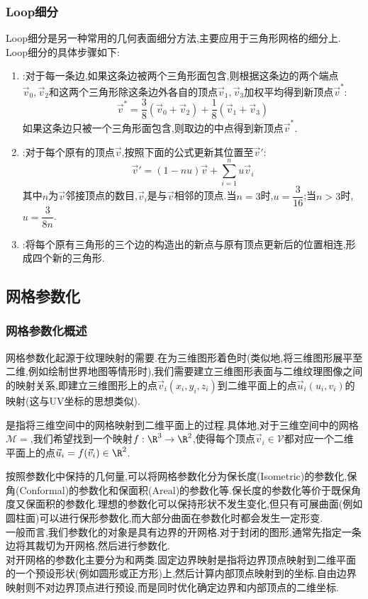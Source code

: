 \documentclass{ctexart}
\begin{document}
\subsubsection{Loop细分}
Loop细分是另一种常用的几何表面细分方法,主要应用于三角形网格的细分上. Loop细分的具体步骤如下:
\begin{enumerate}[label=\tbf{\arabic*}.,topsep=0pt,parsep=0pt,itemsep=0pt,partopsep=0pt]
    \item {}:对于每一条边,如果这条边被两个三角形面包含,则根据这条边的两个端点$\vec{v}_0,\vec{v}_2$和这两个三角形除这条边外各自的顶点$\vec{v}_1,\vec{v}_3$加权平均得到新顶点$\vec{v}^\ast$:
        \[\vec{v}^\ast=\dfrac{3}{8}\left(\vec{v}_0+\vec{v}_2\right)+\dfrac{1}{8}\left(\vec{v}_1+\vec{v}_3\right)\]
    如果这条边只被一个三角形面包含,则取边的中点得到新顶点$\vec{v}^\ast$.
    \item {}:对于每个原有的顶点$\vec{v}$,按照下面的公式更新其位置至$\vec{v}'$:
        \[\vec{v}'=(1-nu)\vec{v}+\sum_{i=1}^{n}u\vec{v}_i\]
        其中$n$为$\vec{v}$邻接顶点的数目,$\vec{v}_i$是与$\vec{v}$相邻的顶点.当$n=3$时,$u=\dfrac{3}{16}$;当$n>3$时,$u=\dfrac{3}{8n}$.
    \item {}:将每个原有三角形的三个边的构造出的新点与原有顶点更新后的位置相连,形成四个新的三角形.
\end{enumerate}
\subsection{网格参数化}
\subsubsection{网格参数化概述}
网格参数化起源于纹理映射的需要.在为三维图形着色时(类似地,将三维图形展平至二维,例如绘制世界地图等情形时),我们需要建立三维图形表面与二维纹理图像之间的映射关系,即建立三维图形上的点$\vec{v}_i\left(x_i,y_i,z_i\right)$到二维平面上的点$\vec{u}_i\left(u_i,v_i\right)$的映射(这与UV坐标的思想类似).
\begin{definition}[网格参数化]
    是指将三维空间中的网格映射到二维平面上的过程.具体地,对于三维空间中的网格$\mathcal{M}=$,我们希望找到一个映射$f:\R^3\to\R^2$,使得每个顶点$\vec{v}_i\in\mathcal{V}$都对应一个二维平面上的点$\vec{u}_i=f(\vec{v}_i)\in\R^2$.
\end{definition}
\indent 按照参数化中保持的几何量,可以将网格参数化分为保长度(Isometric)的参数化,保角(Conformal)的参数化和保面积(Areal)的参数化等.保长度的参数化等价于既保角度又保面积的参数化.理想的参数化可以保持形状不发生变化,但只有可展曲面(例如圆柱面)可以进行保形参数化,而大部分曲面在参数化时都会发生一定形变.\\
\indent 一般而言,我们参数化的对象是具有边界的开网格.对于封闭的图形,通常先指定一条边将其裁切为开网格,然后进行参数化.\\
\indent 对开网格的参数化主要分为和两类.固定边界映射是指将边界顶点映射到二维平面的一个预设形状(例如圆形或正方形)上,然后计算内部顶点映射到的坐标.自由边界映射则不对边界顶点进行预设,而是同时优化确定边界和内部顶点的二维坐标.
\end{document}
